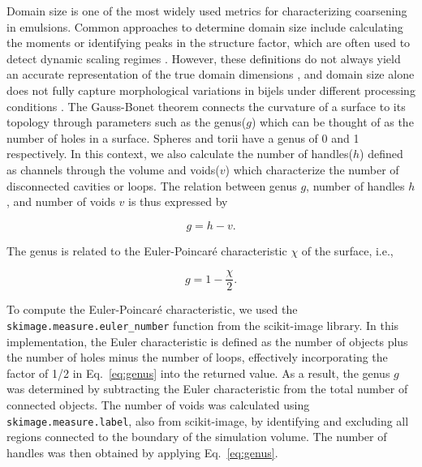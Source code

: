 Domain size is one of the most widely used metrics for characterizing coarsening in emulsions. Common approaches to determine domain size include calculating the moments or identifying peaks in the structure 
factor, which are often used to detect dynamic scaling regimes \cite{kendon_inertial_2001}. However, these definitions do not always yield an accurate representation of the true domain dimensions 
\cite{karthikeyan_formation_2024}, and domain size alone does not fully capture morphological variations in bijels under different processing conditions \cite{reeves_quantitative_2016}. The Gauss-Bonet
theorem connects the curvature of a surface to its topology through parameters such as the genus($g$) which can be thought of as the number of holes in a surface. Spheres and torii have a genus of 0 and 1 respectively. 
In this context, we also calculate the number of handles($h$) defined as channels through the volume and voids($v$) which characterize the number of disconnected cavities or loops. The relation between genus \(g\), 
number of handles \(h\), and number of voids \(v\) is thus expressed by \cite{chan_channel_2012}

\begin{equation}
g = h - v .
\end{equation} 

The genus is related to the Euler-Poincar\'e characteristic \(\chi\) of the surface, i.e., 

\begin{equation}\label{eq:genus}
g = 1 - \frac{\chi}{2} .
\end{equation} 

To compute the Euler-Poincaré characteristic, we used the \texttt{skimage.measure.euler\_number} function from the scikit-image library. In this implementation, the Euler characteristic is defined as the 
number of objects plus the number of holes minus the number of loops, effectively incorporating the factor of 1/2 in Eq.~\ref{eq:genus} into the returned value. As a result, the genus \(g\) was determined 
by subtracting the Euler characteristic from the total number of connected objects. The number of voids was calculated using \texttt{skimage.measure.label}, also from scikit-image, by identifying and 
excluding all regions connected to the boundary of the simulation volume. The number of handles was then obtained by applying Eq.~\ref{eq:genus}.

